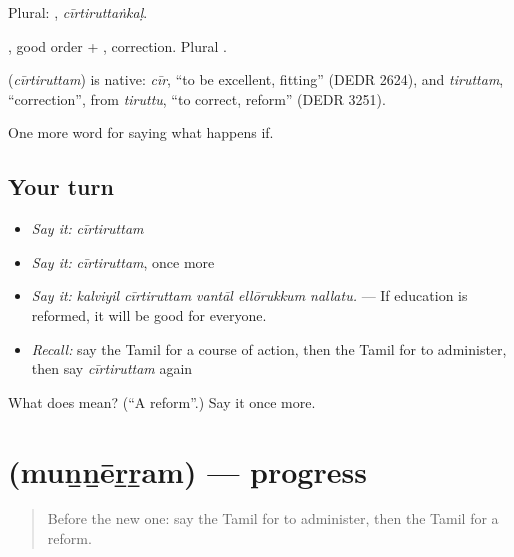 Plural: , \emph{cīrtiruttaṅkaḷ}.

, good order + , correction. Plural .

\begin{cousinweb}
\textbf{} (\emph{cīrtiruttam}) is native: \emph{cīr}, \textquotedblleft{}to be excellent, fitting\textquotedblright{} (DEDR 2624), and \emph{tiruttam}, \textquotedblleft{}correction\textquotedblright{}, from \emph{tiruttu}, \textquotedblleft{}to correct, reform\textquotedblright{} (DEDR 3251).
\end{cousinweb}

\begin{grammarlens}[title={What you've built}]
One more word for saying what happens if.
\end{grammarlens}

\subsection*{Your turn}
\begin{itemize}
\raggedright
  \item \emph{Say it:} \emph{cīrtiruttam}
  \item \emph{Say it:} \emph{cīrtiruttam}, once more
  \item \emph{Say it:} \emph{kalviyil cīrtiruttam vantāl ellōrukkum nallatu.} — If education is reformed, it will be good for everyone.
  \item \emph{Recall:} say the Tamil for a course of action, then the Tamil for to administer, then say \emph{cīrtiruttam} again
\end{itemize}

\begin{tcolorbox}[breakable,colback=teal!4,colframe=teal!35!black,title={Before you move on}]
What does  mean? (\textquotedblleft{}A reform\textquotedblright{}.) Say it once more.
\end{tcolorbox}
\section[\texorpdfstring{\ta{முன்னேற்றம்} (muṉṉēṟṟam)}{முன்னேற்றம் (muṉṉēṟṟam)}]{ (muṉṉēṟṟam) — progress}

\label{lesson:TA-C390-munnerram}



\begin{quote}
Before the new one: say the Tamil for to administer, then the Tamil for a reform.
\end{quote}

